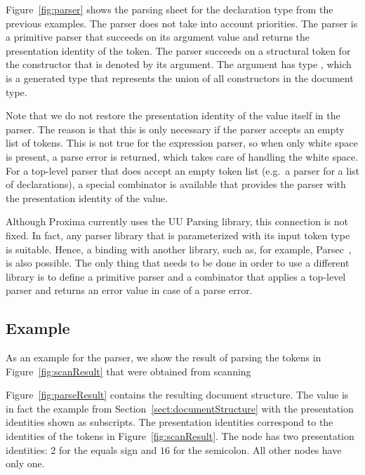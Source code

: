 \documentclass{article}[10pt]
\begin{document}
Figure~\ref{fig:parser} shows the parsing sheet for the declaration type from the previous examples. The parser does not take into account priorities.
The  parser is a primitive parser that succeeds on its argument  value and returns the presentation identity of the token. The  parser succeeds on a structural token for the constructor that is denoted by its argument. The argument has type , which is a generated type that represents the union of all constructors in the document type. 

Note that we do not restore the presentation identity of the  value itself in the  parser. The reason is that this is only necessary if the parser accepts an empty list of tokens. This is not true for the expression parser, so when only white space is present, a parse error is returned, which takes care of handling the white space. For a top-level parser that does accept an empty token list (e.g.\ a parser for a list of declarations), a special combinator is available that provides the parser with the presentation identity of the  value.

Although Proxima currently uses the UU Parsing library, this connection is not fixed. In fact, any  parser library that is parameterized with its input token type is suitable. Hence, a binding with another library, such as, for example, Parsec~\cite{leijen08parsec}, is also possible. The only thing that needs to be done in order to use a different library is to define a primitive parser  and a combinator that applies a top-level parser and returns an error value in case of a parse error.

\subsection{Example} \label{sect:parseExample}

As an example for the parser, we show the result of parsing the tokens in Figure~\ref{fig:scanResult} that were obtained from scanning ~ 

Figure~\ref{fig:parseResult} contains the resulting document structure. The value is in fact the example from Section~\ref{sect:documentStructure} with the presentation identities shown as subscripts. The presentation identities correspond to the identities of the tokens in Figure~\ref{fig:scanResult}. The  node has two presentation identities: $2$ for the equals sign and $16$ for the semicolon. All other nodes have only one. 
\end{document}
